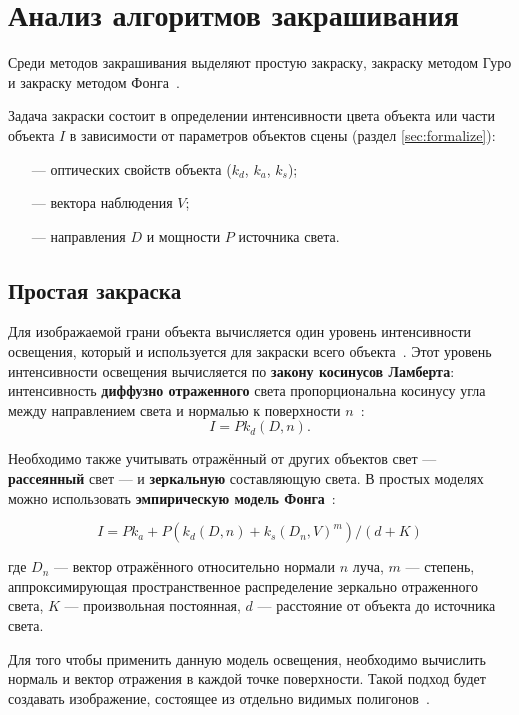 \section{Анализ алгоритмов закрашивания}

Среди методов закрашивания выделяют простую закраску, закраску методом Гуро и закраску методом Фонга~\cite{rodjers}.

Задача закраски состоит в определении интенсивности цвета объекта или части объекта $I$ в зависимости от параметров объектов сцены (раздел \ref{sec:formalize}):
\begin{itemize}
	\item[---] оптических свойств объекта ($k_d$, $k_a$, $k_s$);
	\item[---] вектора наблюдения $V$;
	\item[---] направления $D$ и мощности $P$ источника света.
\end{itemize}

\subsection{Простая закраска}

Для изображаемой грани объекта вычисляется один уровень интенсивности освещения, который и используется для закраски всего объекта~\cite{rodjers}. Этот уровень интенсивности освещения вычисляется по \textbf{закону косинусов Ламберта}: интенсивность \textbf{диффузно отраженного} света пропорциональна косинусу угла между направлением света и нормалью к поверхности $n$~\cite{rodjers, light}: 
\begin{equation}
I = P k_d (D, n).
\end{equation}

Необходимо также учитывать отражённый от других объектов свет --- \textbf{рассеянный} свет --- и \textbf{зеркальную} составляющую света. В простых моделях можно использовать \textbf{эмпирическую модель Фонга}~\cite{rodjers, light}:

\begin{equation}
	I =  P k_a + P (k_d (D, n) + k_s (D_n, V)^m ) / (d + K)
\end{equation}

где $D_n$ --- вектор отражённого относительно нормали $n$ луча, $m$ --- степень, аппроксимирующая пространственное распределение зеркально отраженного света, $K$ --- произвольная постоянная, $d$ --- расстояние от объекта до источника света.

Для того чтобы применить данную модель освещения, необходимо вычислить нормаль и вектор отражения в каждой точке поверхности. Такой подход будет создавать изображение, состоящее из отдельно видимых полигонов~\cite{rodjers, light}.

